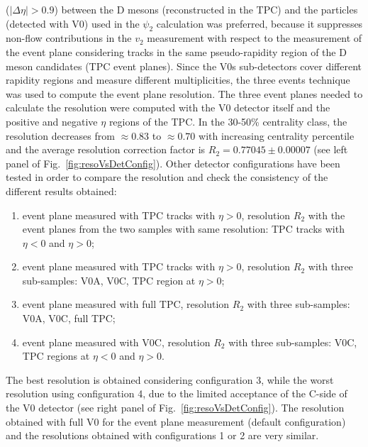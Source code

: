 ($|\Delta\eta|>0.9$) between the D mesons (reconstructed in the TPC)
and the particles (detected with V0) used in the $\psi_2$ calculation was preferred,
because it suppresses non-flow contributions in the $v_2$ measurement with respect
to the measurement of the event plane considering tracks in the same
pseudo-rapidity region of the D meson candidates (TPC event planes).
Since the V0s sub-detectors cover different rapidity 
regions and measure different multiplicities, the
three events technique was used to compute the event plane resolution.
The three event planes needed to calculate the resolution were computed with the V0 detector itself and the 
positive and negative $\eta$ regions of the TPC.
In the 30-50\% centrality class, the resolution decreases from $\approx 0.83$ to $\approx 0.70$ with increasing centrality
percentile and the average resolution correction factor is
$R_2 = 0.77045 \pm 0.00007$ (see left panel 
of Fig.~\ref{fig:resoVsDetConfig}). 
Other detector 
configurations have been tested in order to compare 
the resolution and check the consistency of the different 
results obtained:
\begin{enumerate}
\item event plane measured with TPC tracks with $\eta > 0$,  
resolution $R_2$ with the event planes from the two samples with same resolution: 
TPC tracks with $\eta < 0$ and $\eta > 0$;
\item event plane measured with TPC tracks with $\eta > 0$,  
resolution $R_2$ with three sub-samples: V0A, V0C, TPC region at $\eta > 0$; 
\item event plane measured with full TPC,  
resolution $R_2$ with three sub-samples: V0A, V0C, full TPC; 
\item event plane measured with V0C,  
resolution $R_2$ with three sub-samples:  V0C, TPC regions at $\eta < 0$ and $\eta > 0$.
\end{enumerate}
The best resolution is obtained considering configuration 3, 
while the worst resolution using configuration 4, due to
the limited acceptance of the C-side of the V0 detector (see right panel 
of Fig.~\ref{fig:resoVsDetConfig}). 
The resolution obtained with full V0 for the event
plane measurement (default configuration) and the 
resolutions obtained with configurations 1 or 2 are very similar. 
\\

